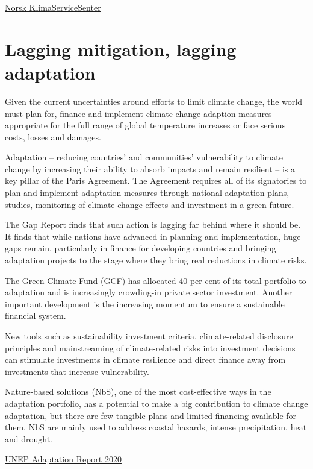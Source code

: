 \documentclass[
]{book}
\begin{document}
\href{https://klimaservicesenter.no/faces/desktop/index.xhtml}{Norsk KlimaServiceSenter}

\hypertarget{lagging-mitigation-lagging-adaptation}{%
\section{Lagging mitigation, lagging adaptation}\label{lagging-mitigation-lagging-adaptation}}

Given the current uncertainties around efforts to limit climate change,
the world must plan for, finance and implement climate change adaption measures
appropriate for the full range of global temperature increases or
face serious costs, losses and damages.

Adaptation -- reducing countries' and communities' vulnerability to climate change
by increasing their ability to absorb impacts and remain resilient --
is a key pillar of the Paris Agreement.
The Agreement requires all of its signatories to plan and implement adaptation measures
through national adaptation plans, studies, monitoring of climate change effects and
investment in a green future.

The Gap Report finds that such action is lagging far behind where it should be.
It finds that while nations have advanced in planning and implementation, huge gaps remain,
particularly in finance for developing countries and
bringing adaptation projects to the stage where they bring real reductions in climate risks.

The Green Climate Fund (GCF) has allocated 40 per
cent of its total portfolio to adaptation and is increasingly crowding-in private sector investment.
Another important development is the increasing momentum to ensure a sustainable financial
system.

New tools such as sustainability investment criteria, climate-related disclosure principles
and mainstreaming of climate-related risks into investment decisions can stimulate investments in
climate resilience and direct finance away from investments that increase vulnerability.

Nature-based solutions (NbS), one of the most cost-effective ways in the adaptation portfolio, has
a potential to make a big contribution to climate change adaptation, but there are few tangible
plans and limited financing available for them.
NbS are mainly used to address coastal hazards, intense precipitation, heat and
drought.

\href{https://www.unep.org/resources/adaptation-gap-report-2020}{UNEP Adaptation Report 2020}
\end{document}
